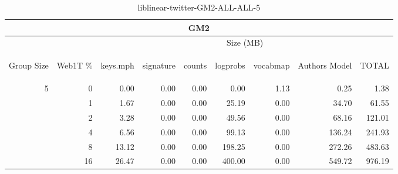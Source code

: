\begin{center}
\begin{table}[htbp]
\begin{tabular}{ | r | r | r | r | r | r | r | r | r |}
\hline
\multicolumn{9}{|c|}{GM2}\\
\hline
 & & \multicolumn{7}{|c|}{Size (MB)}\\ \cline{3-9}
\begin{sideways}Group Size\end{sideways} & \begin{sideways}Web1T \% \end{sideways} & \begin{sideways}keys.mph\end{sideways} & \begin{sideways}signature\end{sideways} & \begin{sideways}counts\end{sideways} & \begin{sideways}logprobs\end{sideways} & \begin{sideways}vocabmap\end{sideways} & \begin{sideways}Authors Model \end{sideways} & \begin{sideways}TOTAL\end{sideways}\\
\hline
\multirow{5}{*}{5}
 & 0 & 0.00 & 0.00 & 0.00 & 0.00 & 1.13 & 0.25 & 1.38\\ \cline{2-9}
 & 1 & 1.67 & 0.00 & 0.00 & 25.19 & 0.00 & 34.70 & 61.55\\ \cline{2-9}
 & 2 & 3.28 & 0.00 & 0.00 & 49.56 & 0.00 & 68.16 & 121.01\\ \cline{2-9}
 & 4 & 6.56 & 0.00 & 0.00 & 99.13 & 0.00 & 136.24 & 241.93\\ \cline{2-9}
 & 8 & 13.12 & 0.00 & 0.00 & 198.25 & 0.00 & 272.26 & 483.63\\ \cline{2-9}
 & 16 & 26.47 & 0.00 & 0.00 & 400.00 & 0.00 & 549.72 & 976.19\\ \cline{2-9}
\hline
\end{tabular}
\caption{liblinear-twitter-GM2-ALL-ALL-5}
\label{table:liblinear-twitter-GM2-ALL-ALL-5}
\end{table}
\end{center}


